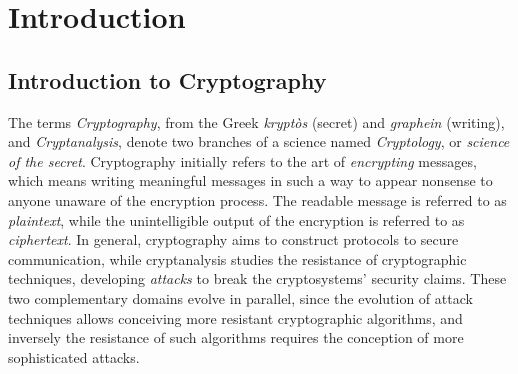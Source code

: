 
\chapter{Introduction} %

\label{ChapterIntroduction}


\section{Introduction to Cryptography}
The terms \emph{Cryptography}, from the Greek \emph{krypt\`os} (secret) and \emph{graphein} (writing), and \emph{Cryptanalysis}, denote two branches of a science named \emph{Cryptology}, or \emph{science of the secret}. Cryptography initially refers to the art of \emph{encrypting} messages, which means writing meaningful messages in such a way to appear nonsense to anyone unaware of the encryption process. The readable message is referred to as \emph{plaintext}, while the unintelligible output of the encryption is referred to as \emph{ciphertext}. In general, cryptography aims to construct protocols to secure communication, while cryptanalysis studies the resistance of cryptographic techniques, developing \emph{attacks} to break the cryptosystems' security claims. These two complementary domains evolve in parallel, since the evolution of attack techniques allows conceiving more resistant cryptographic algorithms, and inversely the resistance of such algorithms requires the conception of more sophisticated attacks.\\

